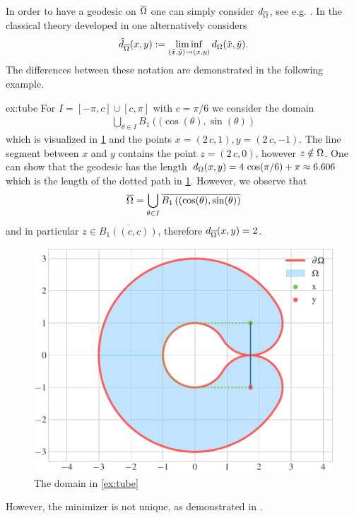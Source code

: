 In order to have a geodesic on $\overline{\Omega}$ one can simply consider $d_{\overline{\Omega}}$, see e.g. \cite{unif}. 
In the classical theory developed in \cite{jensen1993uniqueness} one alternatively considers
%
\begin{align*}
\tilde{d}_{\overline{\Omega}}(x,y) := \liminf_{(\tilde x,\tilde y)\to(x,y)} d_\Omega(\tilde{x},\tilde{y}).
\end{align*}
%
The differences between these notation are demonstrated in the following example.
%
\begin{example}{}{ex:tube}
For $I = [-\pi, c]\cup [c, \pi]$ with $c=\pi/6$ we consider the domain
%
\begin{align*}
\bigcup_{\theta \in I} B_1\left((\cos(\theta),\sin(\theta)\right)
\end{align*}
%
which is visualized in \cref{fig:tube} and the points $x=(2\, c, 1), y= (2\, c, -1)$. The 
line segment between $x$ and $y$ contains the point $z=(2\, c, 0)$, however $z\notin \Omega$. One can show that 
the geodesic has the length $d_\Omega(x,y) = 4\, \cos(\pi/6) + \pi \approx 6.606$ which is the length of the dotted path 
in \cref{fig:tube}. However, we observe that 
%
\begin{align*}
\overline{\Omega} = \bigcup_{\theta \in I } 
\overline{B_1\left((\cos(\theta),\sin(\theta)\right)}
\end{align*}
%
and in particular $z\in \overline{B_1\left((c,c)\right)}$, therefore $d_{\overline{\Omega}}(x,y) = 2$.
\end{example}
%
\begin{figure}
\centering
\includegraphics[width=.5\textwidth]{code/domains/tube.pdf}
\caption{The domain in \cref{ex:tube}}\label{fig:tube}
\end{figure}
However, the minimizer is not unique, as demonstrated 
in \cite{jensen1993uniqueness}. 



